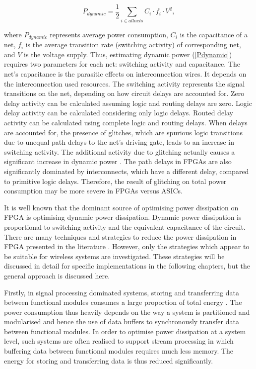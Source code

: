 \begin{center}
\begin{equation}
\label{Pdynamic}
 P_{dynamic} =\frac{1}{2} \sum\limits_{i \in all nets} C_{i} \cdot f_{i} \cdot V^2,
\end{equation}
\end{center}
where $P_{dynamic}$ represents average power consumption, $C_{i}$ is the capacitance of a net, $f_{i}$ is the average transition rate (switching activity) of corresponding net, and $V$ is the voltage supply.
Thus, estimating dynamic power (\ref{Pdynamic}) requires two parameters for each net: switching activity and capacitance.
The net's capacitance is the parasitic effects on interconnection wires. It depends on the interconnection used resources.
The switching activity represents the signal transitions on the net, depending on how circuit delays are accounted for.
Zero delay activity can be calculated assuming logic and routing delays are zero. Logic delay activity can be calculated considering only logic delays.
Routed delay activity can be calculated using complete logic and routing delays.
When delays are accounted for, the presence of glitches, which are spurious logic transitions due to unequal path delays to the net’s driving gate, leads to an increase in switching activity.
The additional activity due to glitching actually causes a significant increase in dynamic power \cite{Anderson2004a}.
The path delays in FPGAs are also significantly dominated by interconnects, which have a different delay, compared to primitive logic delays. Therefore, the result of glitching on total power consumption may be more severe in FPGAs versus ASICs.

It is well known that the dominant source of optimising power dissipation on FPGA is optimising dynamic power dissipation.
Dynamic power dissipation is proportional to switching activity and the equivalent capacitance of the circuit.
There are many techniques and strategies to reduce the power dissipation in FPGA presented in the literature \cite{Danckaert1999,Kovacs2000,Czapski2007,Liu2009,Ahuja2010}.
However, only the strategies which appear to be suitable for wireless systems are investigated.
These strategies will be discussed in detail for specific implementations in the following chapters, but the general approach is discussed here.

Firstly, in signal processing dominated systems, storing and transferring data between functional modules consumes a large proportion of total energy \cite{Liu2009}.
The power consumption thus heavily depends on the way a system is partitioned and modularised and hence the use of data buffers to synchronously transfer data between functional modules.
In order to optimise power dissipation at a system level, such systems are often realised to support stream processing in which buffering data between functional modules requires much less memory.
The energy for storing and transferring data is thus reduced significantly.

